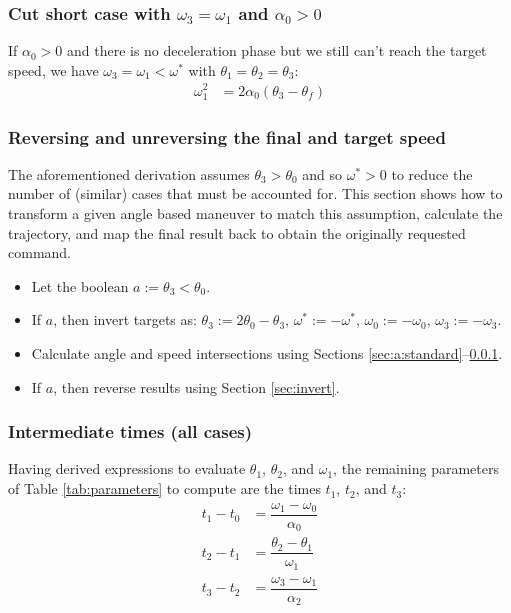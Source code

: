 \documentclass[12pt, a4paper]
{article}
\providecommand{\lr}[1]{\left(#1\right)}
\providecommand{\w}{\omega}
\providecommand{\wt}{\w^*}
\renewcommand{\th}{\theta}
\renewcommand{\a}{\alpha}
\providecommand{\w}{\omega}
\begin{document}
\subsubsection{Cut short case with $\w_3 = \w_1$ and $\a_0 > 0$}
\label{sec:a:cutshortw3isw1}

If $\a_0 > 0$ and there is no deceleration phase but we still can't reach the
target speed, we have $\w_3=\w_1 < \wt$ with $\th_1=\th_2=\th_3$:
%
\begin{align}
    \label{eq:a:cutshortw1}
    \w_1^2  &= 2\a_0\lr{\th_3 - \th_f}
\end{align}

\subsubsection{Reversing and unreversing the final and target speed}
\label{sec:a:reversing}
The aforementioned derivation assumes $\th_3 > \th_0$ and so $\wt > 0$ to
reduce the number of (similar) cases that must be accounted for. This section
shows how to transform a given angle based maneuver to match this assumption,
calculate the trajectory, and map the final result back to obtain the
originally requested command.

\begin{itemize}
    \item Let the boolean $a := \th_3 < \th_0$.
    \item If $a$, then invert targets as:
          $\th_3 := 2 \th_0 - \th_3$, $\wt := -\wt$, $\w_0 := -\w_0$,
          $\w_3 := -\w_3$.
    \item Calculate angle and speed intersections using
          Sections \ref{sec:a:standard}--\ref{sec:a:cutshortw3isw1}.
    \item If $a$, then reverse results using Section \ref{sec:invert}.
\end{itemize}


\subsubsection{Intermediate times (all cases)}

Having derived expressions to evaluate $\th_1$, $\th_2$, and $\w_1$, the
remaining parameters of Table \ref{tab:parameters} to compute are the times
$t_1$, $t_2$, and $t_3$:
%
\begin{align}
    t_1 - t_0 &= \dfrac{\w_1-\w_0}{\a_0}\\[1em]
    t_2 - t_1 &= \dfrac{\th_2-\th_1}{\w_1}\\[1em]
    t_3 - t_2 &= \dfrac{\w_3-\w_1}{\a_2}
\end{align}
\end{document}
